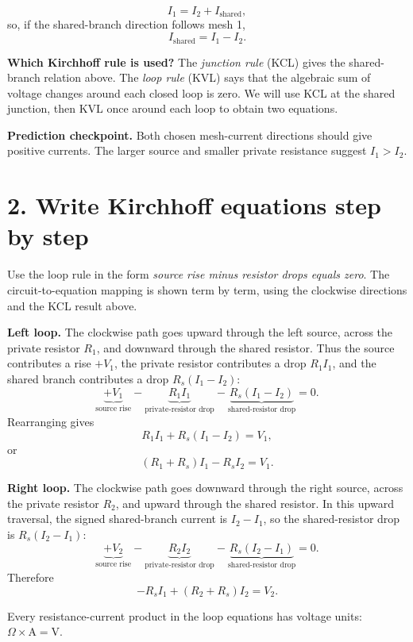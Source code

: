 \documentclass[11pt,a4paper]{article}
\begin{document}
\[
I_1=I_2+I_{\mathrm{shared}},
\]
so, if the shared-branch direction follows mesh 1,
\[
I_{\mathrm{shared}}=I_1-I_2.
\]

\begin{keybox}\textbf{Which Kirchhoff rule is used?} The \emph{junction rule} (KCL) gives the shared-branch relation above. The \emph{loop rule} (KVL) says that the algebraic sum of voltage changes around each closed loop is zero. We will use KCL at the shared junction, then KVL once around each loop to obtain two equations.\end{keybox}

\begin{checkbox}\textbf{Prediction checkpoint.} Both chosen mesh-current directions should give positive currents. The larger source and smaller private resistance suggest $I_1>I_2$.\end{checkbox}

\section*{2. Write Kirchhoff equations step by step}
Use the loop rule in the form \emph{source rise minus resistor drops equals zero}. The circuit-to-equation mapping is shown term by term, using the clockwise directions and the KCL result above.

\textbf{Left loop.} The clockwise path goes upward through the left source, across the private resistor $R_1$, and downward through the shared resistor. Thus the source contributes a rise $+V_1$, the private resistor contributes a drop $R_1I_1$, and the shared branch contributes a drop $R_s(I_1-I_2)$:
\[
\underbrace{+V_1}_{\text{source rise}}
-\underbrace{R_1I_1}_{\text{private-resistor drop}}
-\underbrace{R_s(I_1-I_2)}_{\text{shared-resistor drop}}=0.
\]
Rearranging gives
\[
R_1I_1+R_s(I_1-I_2)=V_1,
\]
or
\[
(R_1+R_s)I_1-R_sI_2=V_1.
\]

\textbf{Right loop.} The clockwise path goes downward through the right source, across the private resistor $R_2$, and upward through the shared resistor. In this upward traversal, the signed shared-branch current is $I_2-I_1$, so the shared-resistor drop is $R_s(I_2-I_1)$:
\[
\underbrace{+V_2}_{\text{source rise}}
-\underbrace{R_2I_2}_{\text{private-resistor drop}}
-\underbrace{R_s(I_2-I_1)}_{\text{shared-resistor drop}}=0.
\]
Therefore
\[
-R_sI_1+(R_2+R_s)I_2=V_2.
\]

Every resistance-current product in the loop equations has voltage units: $\Omega\times\mathrm{A}=\mathrm{V}$.
\end{document}
